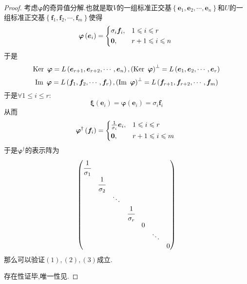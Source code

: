 {\begin{proof}
        考虑$\bm{\varphi}$的奇异值分解.也就是取$V$的一组标准正交基$\left\{
            \bm{e}_1,\bm{e}_2,\cdots,\bm{e}_n
            \right\}$和$U$的一组标准正交基$\left\{
            \bm{f}_1,\bm{f}_2,\cdots,\bm{f}_m
            \right\}$使得\[
            \bm{\varphi}\left(
            \bm{e}_i
            \right)=
            \begin{cases*}
                \sigma_i\bm{f}_i, & $1\leqslant i\leqslant r$   \\
                \bm{0},           & $r+1\leqslant i\leqslant n$
            \end{cases*}
        \]于是\[
            \operatorname{Ker\,} \,\bm{\varphi}=L\left(
            \bm{e}_{r+1},\bm{e}_{r+2},\cdots,\bm{e}_n
            \right),\left(
            \operatorname{Ker\,} \,\bm{\varphi}
            \right)^{\perp}=L\left(
            \bm{e}_1,\bm{e}_2,\cdots,\bm{e}_r
            \right)
        \]\[
            \operatorname{Im\,} \,\bm{\varphi}=L\left(
            \bm{f}_1,\bm{f}_2,\cdots,\bm{f}_r
            \right),\left(
            \operatorname{Im\,} \,\bm{\varphi}
            \right)^{\perp}=L\left(
            \bm{f}_{r+1},\bm{f}_{r+2},\cdots,\bm{f}_m
            \right)
        \]于是$\forall1\leqslant i\leqslant r:$\[
            \bm{\xi}\left(
            \bm{e}_i
            \right)=\bm{\varphi}\left(
            \bm{e}_i
            \right)=\sigma_i\bm{f}_i
        \]从而\[
            \bm{\varphi}^{\dagger}\left(
            \bm{f}_i
            \right)=\begin{cases*}
                \frac{1}{\sigma_i}\bm{e}_i, & $1\leqslant i\leqslant r$   \\
                \bm{0},                     & $r+1\leqslant i\leqslant m$
            \end{cases*}
        \]于是$\bm{\varphi}^{\dagger}$的表示阵为\[
            \begin{pmatrix}
                \cfrac{1}{\sigma_1} &                     &        &                     &   &        &   \\
                                    & \cfrac{1}{\sigma_2} &        &                     &   &        &   \\
                                    &                     & \ddots &                     &   &        &   \\
                                    &                     &        & \cfrac{1}{\sigma_r} &   &        &   \\
                                    &                     &        &                     & 0 &        &   \\
                                    &                     &        &                     &   & \ddots &   \\
                                    &                     &        &                     &   &        & 0
            \end{pmatrix}
        \]那么可以验证$(1),(2),(3)$成立.

        存在性证毕,唯一性见\cite{torsor3}.
    \end{proof}
}
